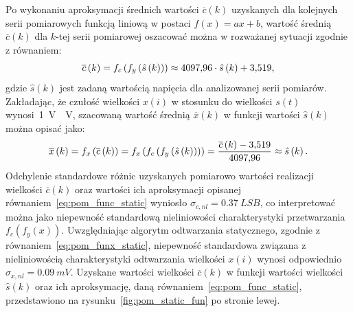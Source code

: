 Po wykonaniu aproksymacji średnich wartości $\overline{c}(k)$ uzyskanych dla kolejnych serii pomiarowych funkcją liniową w postaci $f(x) = ax + b$, wartość średnią $\overline{c}(k)$ dla $k$-tej serii pomiarowej oszacować można w rozważanej sytuacji zgodnie z równaniem:
\begin{equation}
\overline{c} \left(k\right) = f_{c} \left(f_{y} \left(\hat{s} \left(k\right)\right)\right) \approx \num{4097.96} \cdot \hat{s} \left(k\right) + \num{3.519} \label{eq:pom_func_static},
\end{equation}
gdzie $\hat{s}(k)$ jest zadaną wartością napięcia dla analizowanej serii pomiarów. Zakładając, że czułość wielkości $x(i)$ w stosunku do wielkości $s(t)$ wynosi~\qty{1}{V \per V}, szacowaną wartość średnią $\overline{x}(k)$ w funkcji wartości $\hat{s}(k)$ można opisać jako:
\begin{equation}
\overline{x} \left(k\right) = f_{x} \left(\overline{c} \left(k\right)\right) = f_{x} \left(f_{c} \left(f_{y} \left(\hat{s} \left(k\right)\right)\right)\right) = \frac{\overline{c} \left(k\right) - \num{3.519}}{\num{4097.96}} \approx \hat{s} \left(k\right) \label{eq:pom_funx_static}.
\end{equation}
Odchylenie standardowe różnic uzyskanych pomiarowo wartości realizacji wielkości $\overline{c}(k)$ oraz wartości ich aproksymacji opisanej równaniem~\eqref{eq:pom_func_static} wyniosło $\sigma_{c,nl} = \qty{0.37}{LSB}$, co interpretować można jako niepewność standardową nieliniowości charakterystyki przetwarzania $f_{c}(f_{y}(x))$. Uwzględniając algorytm odtwarzania statycznego, zgodnie z równaniem~\eqref{eq:pom_funx_static}, niepewność standardowa związana z nieliniowością charakterystyki odtwarzania wielkości $x(i)$ wynosi odpowiednio $\sigma_{x,nl} = \qty{0.09}{mV}$. Uzyskane wartości wielkości $\overline{c}(k)$ w funkcji wartości wielkości $\hat{s}(k)$ oraz ich aproksymację, daną równaniem~\eqref{eq:pom_func_static}, przedstawiono na rysunku~\ref{fig:pom_static_fun} po stronie lewej.

